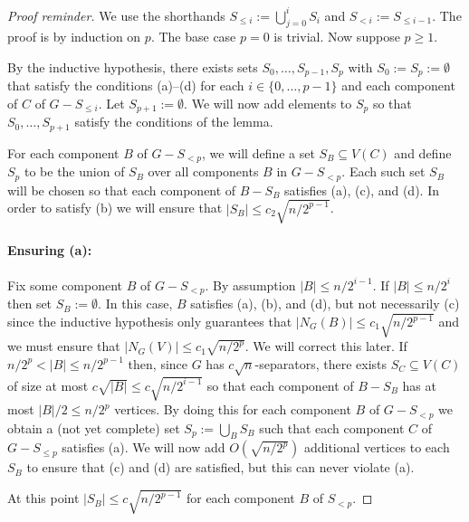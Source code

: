 \documentclass{patmorin}
\renewcommand{\ge}{\geqslant}
\renewcommand{\le}{\leqslant}
\begin{document}
\begin{proof}[Proof reminder]
  We use the shorthands $S_{\le i}:=\bigcup_{j=0}^i S_i$ and $S_{<i}:=S_{\le i-1}$.  The proof is by induction on $p$.  The base case $p=0$ is trivial.  Now suppose $p\ge 1$.

  By the inductive hypothesis, there exists sets $S_0,\ldots,S_{p-1},S_{p}$ with $S_0:=S_p:=\emptyset$ that satisfy the conditions (a)--(d) for each $i\in\{0,\ldots,p-1\}$ and each component of $C$ of $G-S_{\le i}$. Let $S_{p+1}:=\emptyset$.  We will now add elements to $S_p$ so that $S_0,\ldots,S_{p+1}$ satisfy the conditions of the lemma.

  For each component $B$ of $G-S_{<p}$, we will define a set $S_B\subseteq V(C)$ and define $S_p$ to be the union of $S_B$ over all components $B$ in $G-S_{<p}$. Each such set $S_B$ will be chosen so that each component of $B-S_B$ satisfies (a), (c), and (d).  In order to satisfy (b) we will ensure that $|S_B|\le c_2\sqrt{n/2^{p-1}}$.

  \paragraph{Ensuring (a):}
  Fix some component $B$ of $G-S_{<p}$. By assumption $|B|\le n/2^{i-1}$.  If $|B|\le n/2^i$ then set $S_B:=\emptyset$.  In this case, $B$ satisfies (a), (b), and (d), but not necessarily (c) since the inductive hypothesis only guarantees that $|N_G(B)| \le c_1\sqrt{n/2^{p-1}}$ and we must ensure that $|N_G(V)|\le c_1\sqrt{n/2^p}$.  We will correct this later. If $n/2^p < |B| \le n/2^{p-1}$ then, since $G$ has $c\sqrt{n}$-separators, there exists $S_C\subseteq V(C)$ of size at most $c\sqrt{|B|}\le c\sqrt{n/2^{i-1}}
  $ so that each component of $B-S_B$ has at most $|B|/2\le n/2^{p}$ vertices.
  By doing this for each component $B$ of $G-S_{<p}$ we obtain a (not yet complete) set $S_{p}:=\bigcup_B S_B$ such that each component $C$ of $G-S_{\le p}$ satisfies (a).  We will now add $O(\sqrt{n/2^p})$ additional vertices to each $S_B$ to ensure that (c) and (d) are satisfied, but this can never violate (a).

  At this point $|S_B|\le c\sqrt{n/2^{p-1}}$ for each component $B$ of $S_{<p}$.




\end{proof}
\end{document}
